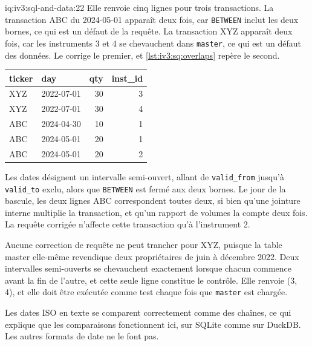 \begin{solution}{iq:iv3:sql-and-data:22}
Elle renvoie cinq lignes pour trois transactions. La transaction ABC du 2024-05-01 apparaît deux fois, car \texttt{BETWEEN} inclut les deux bornes, ce qui est un défaut de la requête. La transaction XYZ apparaît deux fois, car les instruments 3 et 4 se chevauchent dans \texttt{master}, ce qui est un défaut des données. Le  corrige le premier, et \cref{lst:iv3:sq:overlaps} repère le second.
\begin{center}\small
\begin{tabular}{llrr}
ticker & day & qty & inst\_id\\\hline
XYZ & 2022-07-01 & 30 & 3\\
XYZ & 2022-07-01 & 30 & 4\\
ABC & 2024-04-30 & 10 & 1\\
ABC & 2024-05-01 & 20 & 1\\
ABC & 2024-05-01 & 20 & 2
\end{tabular}
\end{center}
\label{lst:iv3:sq:pitfixed}
\label{lst:iv3:sq:overlaps}

Les dates désignent un intervalle semi-ouvert, allant de \texttt{valid\_from} jusqu'à \texttt{valid\_to} exclu, alors que \texttt{BETWEEN} est fermé aux deux bornes. Le jour de la bascule, les deux lignes ABC correspondent toutes deux, si bien qu'une jointure interne multiplie la transaction, et qu'un rapport de volumes la compte deux fois. La requête corrigée n'affecte cette transaction qu'à l'instrument 2.

Aucune correction de requête ne peut trancher pour XYZ, puisque la table master elle-même revendique deux propriétaires de juin à décembre 2022. Deux intervalles semi-ouverts se chevauchent exactement lorsque chacun commence avant la fin de l'autre, et cette seule ligne constitue le contrôle. Elle renvoie (3, 4), et elle doit être exécutée comme test chaque fois que \texttt{master} est chargée.

Les dates ISO en texte se comparent correctement comme des chaînes, ce qui explique que les comparaisons fonctionnent ici, sur SQLite comme sur DuckDB. Les autres formats de date ne le font pas.

\end{solution}

